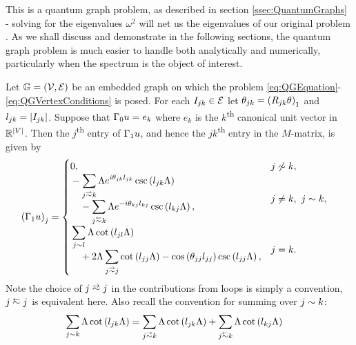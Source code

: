 This is a quantum graph problem, as described in section \ref{ssec:QuantumGraphs} - solving for the eigenvalues $\omega^2$ will net us the eigenvalues of our original problem .
As we shall discuss and demonstrate in the following sections, the quantum graph problem is much easier to handle both analytically and numerically, particularly when the spectrum is the object of interest.

\begin{prop} \label{prop:M-MatrixEntries}
	Let $\mathbb{G}=\left( \mathcal{V},\mathcal{E} \right)$ be an embedded graph on which the problem \eqref{eq:QGEquation}-\eqref{eq:QGVertexConditions} is posed.
	For each $I_{jk}\in \mathcal{E}$ let $\theta_{jk} = \left( R_{jk}\theta \right)_1$ and $l_{jk} = \left\lvert I_{jk} \right\rvert$.
	Suppose that $\Gamma_0 u = e_k$ where $e_k$ is the $k$\textsuperscript{th} canonical unit vector in $\mathbb{R}^{\left\lvert V \right\rvert}$.
	Then the $j$\textsuperscript{th} entry of $\Gamma_1 u$, and hence the $jk$\textsuperscript{th} entry in the $M$-matrix, is given by
	\begin{align*}
		\bracs{\nmap u}_j &= 
		\begin{cases}
			\!\begin{aligned}
				&0,
			\end{aligned}			
			& j \not\con k, \\
			\!\begin{aligned}
				&-\sum_{j\conLeft k} \effFreq e^{i\qm_{jk}l_{jk}} \csc\bracs{l_{jk}\effFreq} 
				\\ &\quad - \sum_{j\conRight k} \effFreq e^{-i\qm_{kj}l_{kj}} \csc\bracs{l_{kj}\effFreq},
			\end{aligned}
			& j\neq k, \ j\con k, \\
			\!\begin{aligned}
				&\sum_{j\con l} \effFreq\cot\bracs{l_{jl}\effFreq}
				\\ &\quad + 2\effFreq\sum_{j\conLeft j} \cot\bracs{l_{jj}\effFreq} - \cos\bracs{\qm_{jj}l_{jj}}\csc\bracs{l_{jj}\effFreq},
			\end{aligned}
			& j=k.
		\end{cases}
	\end{align*}
	Note the choice of $j\conLeft j$ in the contributions from loops is simply a convention, $j\conRight j$ is equivalent here.
	Also recall the convention for summing over $j\sim k$:
	\begin{align*}
		\sum_{j\con k} \effFreq\cot\bracs{l_{jk}\effFreq} &= \sum_{j\conLeft k} \effFreq\cot\bracs{l_{jk}\effFreq}	+ \sum_{j\conRight k} \effFreq\cot\bracs{l_{kj}\effFreq}
	\end{align*}
\end{prop}
